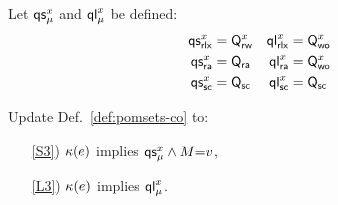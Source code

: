 \begin{definition}
  \label{def:QS}
  Let $\mathsf{qs}_{\mu}^{x}$ and $\mathsf{ql}_{\mu}^{x}$ be defined:
  \begin{align*}
    \mathsf{qs}_{{\mathsf{rlx}}}^{x}&=\mathsf{Q}_{\mathsf{rw}}^{x}
    &\mathsf{ql}_{{\mathsf{rlx}}}^{x}&=\mathsf{Q}_{\mathsf{wo}}^{x}
    \\
    \mathsf{qs}_{{\mathsf{ra}}}^{x}&=\mathsf{Q}_{{\mathsf{ra}}}
    &\mathsf{ql}_{{\mathsf{ra}}}^{x}&=\mathsf{Q}_{\mathsf{wo}}^{x}
    \\
    \mathsf{qs}_{{\mathsf{sc}}}^{x}&=\mathsf{Q}_{{\mathsf{sc}}}
    &\mathsf{ql}_{{\mathsf{sc}}}^{x}&=\mathsf{Q}_{{\mathsf{sc}}}
  \end{align*}
\end{definition}

\begin{definition}[$\xCO$/$\xRASC$]
  \label{def:pomsets-ra}
  Update Def.~\ref{def:pomsets-co} to:
  \begin{enumerate}
  \item[\ref{S3})]
    $\kappa(e)$ implies $\mathsf{qs}_{\mu}^{x}\land M{=}v$,
  \item[\ref{L3})]
    $\kappa(e)$ implies $\mathsf{ql}_{\mu}^{x}$.
  \end{enumerate}
\end{definition}







